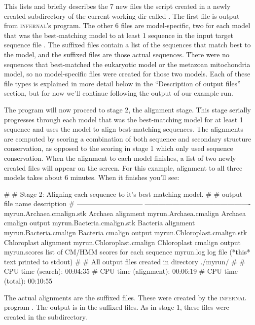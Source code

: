This lists and briefly describes the 7 new files the script created in
a newly created subdirectory of the current working dir called
. The first file  is output from
\textsc{infernal}'s  program. The other 6 files are
model-specific, two for each model that was the best-matching model to
at least 1 sequence in the input target sequence file
. The  suffixed files contain a list
of the sequences that match best to the model, and the 
suffixed files are those actual sequences. There were no sequences
that best-matched the eukaryotic model or the metazoan mitochondria
model, so no model-specific files were created for those two models.
Each of these file types is explained in more detail below in the
``Description of output files'' section, but for now we'll continue
following the output of our example  run.

The program will now proceed to stage 2, the alignment stage. This
stage serially progresses through each model that was the
best-matching model for at least 1 sequence and uses the model to
align best-matching sequences. The alignments are computed by scoring
a combination of both sequence and secondary structure conservation,
as opposed to the scoring in stage 1 which only used sequence
conservation. When the alignment to each model finishes, a list of two
newly created files will appear on the screen. For this example,
alignment to all three models takes about 6 minutes. When it finishes
you'll see:

\begin{sreoutput}
#
# Stage 2: Aligning each sequence to it's best matching model.
#
# output file name               description
# -----------------------------  ----------------------------------------------
  myrun.Archaea.cmalign.stk      Archaea alignment
  myrun.Archaea.cmalign          Archaea cmalign output
  myrun.Bacteria.cmalign.stk     Bacteria alignment
  myrun.Bacteria.cmalign         Bacteria cmalign output
  myrun.Chloroplast.cmalign.stk  Chloroplast alignment
  myrun.Chloroplast.cmalign      Chloroplast cmalign output
  myrun.scores                   list of CM/HMM scores for each sequence
  myrun.log                      log file (*this* text printed to stdout)
#
# All output files created in directory ./myrun/
#
# CPU time (search):     00:04:35
# CPU time (alignment):  00:06:19
# CPU time (total):      00:10:55
\end{sreoutput}

The actual alignments are the  suffixed
files. These were created by the \textsc{infernal} program
. The  output is in the 
suffixed files.  As in stage 1, these files were created in
the  subdirectory. 


